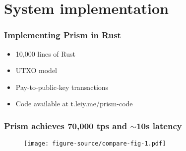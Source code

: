 \documentclass[aspectratio=169]{beamer}
\begin{document}
\section{System implementation}

\begin{frame}
\end{frame}

\begin{frame}
    \frametitle{Implementing Prism in Rust}
    \begin{itemize}
        \item 10,000 lines of Rust
        \item UTXO model
        \item Pay-to-public-key transactions
        \item Code available at t.leiy.me/prism-code
    \end{itemize}
\end{frame}

\begin{frame}
    \frametitle{Prism achieves 70,000 tps and $\sim$10s latency}
    \begin{figure}
        \centering
        \texttt{[image: figure-source/compare-fig-1.pdf]}
    \end{figure}
\end{frame}
\end{document}
